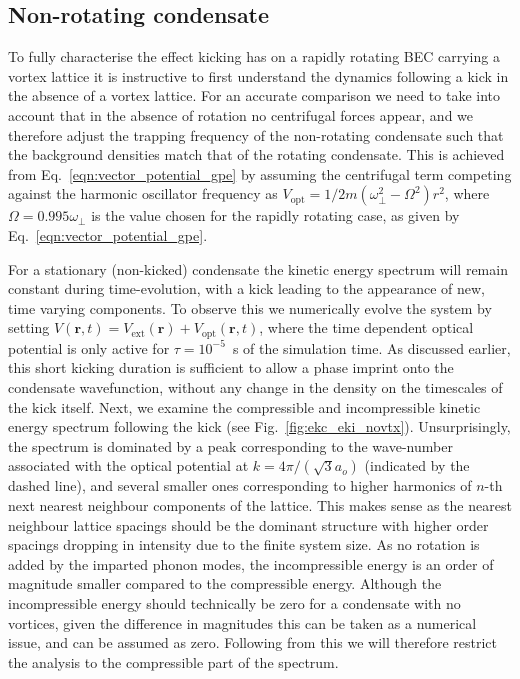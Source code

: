 \subsection{Non-rotating condensate}
To fully characterise the effect kicking has on a rapidly rotating BEC carrying a vortex lattice it is instructive to first understand the dynamics following a kick in the absence of a vortex lattice. For an accurate comparison we need to take into account that in the absence of rotation no centrifugal forces appear, and we therefore adjust the trapping frequency of the non-rotating condensate such that the background densities match that of the rotating condensate. This is achieved from Eq.~\ref{eqn:vector_potential_gpe} by assuming the centrifugal term competing against the harmonic oscillator frequency  as $V_{\text{opt}} = 1/2m(\omega^2_\perp - \Omega^2)
{r}^2$, where $\Omega=0.995\omega_\perp$ is the value chosen for the rapidly rotating case, as given by Eq.~\eqref{eqn:vector_potential_gpe}.

For a stationary (non-kicked) condensate the kinetic energy spectrum will remain constant during time-evolution, with a kick leading to the appearance of new, time varying components. To observe this we numerically evolve the system by setting $V(\mathbf{r},t) = V_{\text{ext}}(\mathbf{r}) + V_{\text{opt}}(\mathbf{r},t)$, where the time dependent optical potential is only active for $\tau=10^{-5}$~s of the simulation time. As discussed earlier, this short kicking duration is sufficient to allow a phase imprint onto the condensate wavefunction, without any change in the density on the timescales of the kick itself. Next, we examine the compressible and incompressible kinetic energy spectrum following the kick (see Fig.~\ref{fig:ekc_eki_novtx}). Unsurprisingly, the spectrum is dominated by a peak corresponding to the wave-number associated with the optical potential at $k=4\pi/(\sqrt{3}a_o)$ (indicated by the dashed line), and several smaller ones corresponding to higher harmonics of $n$-th next nearest neighbour components of the lattice. This makes sense as the nearest neighbour lattice spacings should be the dominant structure with higher order spacings dropping in intensity due to the finite system size. As no rotation is added by the imparted phonon modes, the incompressible energy is an order of magnitude smaller compared to the compressible energy. Although the incompressible energy should technically be zero for a condensate with no vortices, given the difference in magnitudes this can be taken as a numerical issue, and can be assumed as zero. Following from this we will therefore restrict the analysis to the compressible part of the spectrum.

